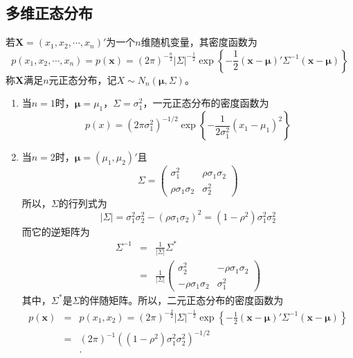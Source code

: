 \subsection{多维正态分布}
\begin{definition}
若$\bm{X}=\left(x_{1}, x_{2}, \cdots, x_{n}\right)'$为一个$n$维随机变量，其密度函数为$$p\left(x_{1}, x_{2}, \cdots, x_{n}\right)=p(\bm{x})=(2 \pi)^{-\frac{n}{2}}|\Sigma|^{-\frac{1}{2}} \exp \left\{-\frac{1}{2}(\bm{x}-\bm{\mu})' \Sigma^{-1}(\bm{x}-\bm{\mu})\right\}$$
称$\bm{X}$满足$n$元正态分布，记$X \sim N_{n}(\bm{\mu}, \Sigma)$。
\end{definition}
\begin{remark}
    \begin{enumerate}
        \item 当$n=1$时，$\bm{\mu} = \mu_1$，$\Sigma = \sigma_1^2$，一元正态分布的密度函数为
        $$
        p(x) = (2\pi \sigma_1^2)^{-1/2} \exp\left\{
        -\frac{1}{2\sigma_1^2} (x_1-\mu_1)^2
        \right\}
        $$
        \item 当$n=2$时，$\bm{\mu} = (\mu_1,\mu_2)'$且$$
        \Sigma = \begin{pmatrix}
        \sigma_1^2 & \rho \sigma_1\sigma_2\\
        \rho \sigma_1\sigma_2 & \sigma_2^2
        \end{pmatrix}
        $$
        所以，$\Sigma$的行列式为
        $$
        |\Sigma| = \sigma_1^2\sigma_2^2 - (\rho \sigma_1\sigma_2)^2 = (1-\rho^2) \sigma_1^2\sigma_2^2
        $$
        而它的逆矩阵为
        \begin{eqnarray*}
             \Sigma^{-1} &=& \frac{1}{|\Sigma|} \Sigma^{\ast}\\
             &=& \frac{1}{|\Sigma|}\begin{pmatrix}
                 \sigma_2^2 & -\rho \sigma_1\sigma_2 \\
                 -\rho \sigma_1\sigma_2 & \sigma_1^2
             \end{pmatrix} 
        \end{eqnarray*}
       其中，$\Sigma^{\ast}$是$\Sigma$的伴随矩阵。所以，二元正态分布的密度函数为
       \begin{eqnarray*}
           p(\bm{x}) &=&p(x_1,x_2) =  (2 \pi)^{-\frac{2}{2}}|\Sigma|^{-\frac{1}{2}} \exp \left\{-\frac{1}{2}(\bm{x}-\bm{\mu})' \Sigma^{-1}(\bm{x}-\bm{\mu})\right\}\\
           &=& (2 \pi)^{-1} \left((1-\rho^2) \sigma_1^2\sigma_2^2\right)^{-1/2}\\
           &&\cdot

\end{eqnarray*}
\end{enumerate}
\end{remark}
